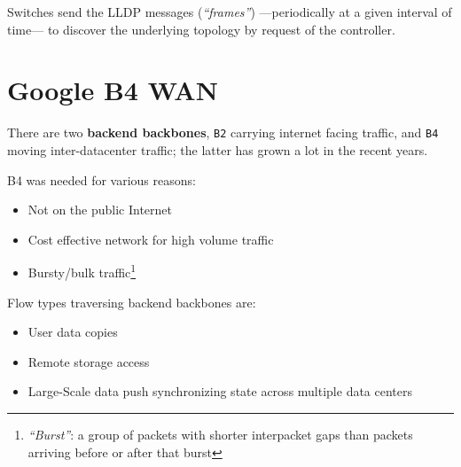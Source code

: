Switches send the LLDP messages (\textit{``frames''}) ---periodically at a given interval of time--- to discover the underlying topology by request of the controller.


\section{Google B4 WAN}
There are two \textbf{backend backbones}, \texttt{B2} carrying internet facing traffic, and \texttt{B4} moving inter-datacenter traffic; the latter has grown a lot in the recent years.

B4 was needed for various reasons:
\begin{itemize}
   \item Not on the public Internet
   \item Cost effective network for high volume traffic
   \item Bursty/bulk traffic\footnote{\textit{``Burst''}: a group of packets with shorter interpacket gaps than packets arriving before or after that burst}
\end{itemize}

Flow types traversing backend backbones are:
\begin{itemize}
   \item User data copies
   \item Remote storage access
   \item Large-Scale data push synchronizing state across multiple data centers
\end{itemize}